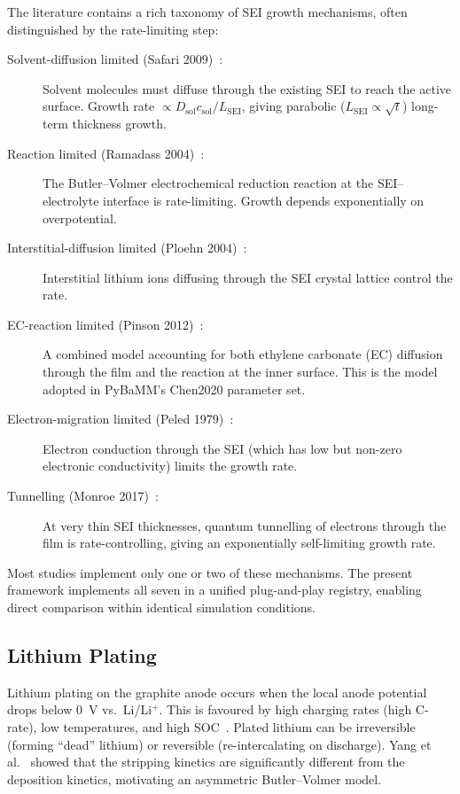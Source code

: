 The literature contains a rich taxonomy of SEI growth mechanisms, often distinguished by the rate-limiting step:

\begin{description}
  \item[Solvent-diffusion limited (Safari 2009)~\cite{Safari2009}:] Solvent molecules must diffuse through the existing SEI to reach the active surface. Growth rate $\propto D_\text{sol} c_\text{sol} / L_\text{SEI}$, giving parabolic ($L_\text{SEI} \propto \sqrt{t}$) long-term thickness growth.

  \item[Reaction limited (Ramadass 2004)~\cite{Ramadass2004}:] The Butler--Volmer electrochemical reduction reaction at the SEI--electrolyte interface is rate-limiting. Growth depends exponentially on overpotential.

  \item[Interstitial-diffusion limited (Ploehn 2004)~\cite{Ploehn2004}:] Interstitial lithium ions diffusing through the SEI crystal lattice control the rate.

  \item[EC-reaction limited (Pinson 2012)~\cite{Pinson2012}:] A combined model accounting for both ethylene carbonate (EC) diffusion through the film and the reaction at the inner surface. This is the model adopted in PyBaMM's Chen2020 parameter set.

  \item[Electron-migration limited (Peled 1979)~\cite{Peled1979}:] Electron conduction through the SEI (which has low but non-zero electronic conductivity) limits the growth rate.

  \item[Tunnelling (Monroe 2017)~\cite{Monroe2017}:] At very thin SEI thicknesses, quantum tunnelling of electrons through the film is rate-controlling, giving an exponentially self-limiting growth rate.
\end{description}

Most studies implement only one or two of these mechanisms. The present framework implements all seven in a unified plug-and-play registry, enabling direct comparison within identical simulation conditions.

\subsection{Lithium Plating}
\label{ssec:lit_li_plating}

Lithium plating on the graphite anode occurs when the local anode potential drops below 0~V vs.\ Li/Li$^+$. This is favoured by high charging rates (high C-rate), low temperatures, and high SOC~\cite{Legrand2014,Persson2010}. Plated lithium can be irreversible (forming ``dead'' lithium) or reversible (re-intercalating on discharge). Yang et al.~\cite{Yang2017} showed that the stripping kinetics are significantly different from the deposition kinetics, motivating an asymmetric Butler--Volmer model.

